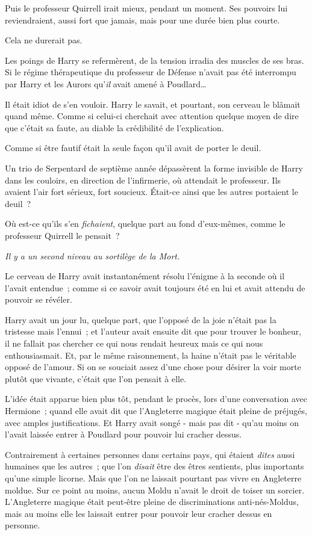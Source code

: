 Puis le professeur Quirrell irait mieux, pendant un moment. Ses pouvoirs lui reviendraient, aussi fort que jamais, mais pour une durée bien plus courte.

Cela ne durerait pas.

Les poings de Harry se refermèrent, de la tension irradia des muscles de ses bras. Si le régime thérapeutique du professeur de Défense n'avait pas été interrompu par Harry et les Aurors qu'\emph{il} avait amené à Poudlard…

Il était idiot de s'en vouloir. Harry le savait, et pourtant, son cerveau le blâmait quand même. Comme si celui-ci cherchait avec attention quelque moyen de dire que c'était sa faute, au diable la crédibilité de l'explication.

Comme si être fautif était la seule façon qu'il avait de porter le deuil.

Un trio de Serpentard de septième année dépassèrent la forme invisible de Harry dans les couloirs, en direction de l'infirmerie, où attendait le professeur. Ils avaient l'air fort sérieux, fort soucieux. Était-ce ainsi que les autres portaient le deuil~?

Où est-ce qu'ils s'en \emph{fichaient}, quelque part au fond d'eux-mêmes, comme le professeur Quirrell le pensait~?

\emph{Il y a un second niveau au sortilège de la Mort.}

Le cerveau de Harry avait instantanément résolu l'énigme à la seconde où il l'avait entendue~; comme si ce savoir avait toujours été en lui et avait attendu de pouvoir se révéler.

Harry avait un jour lu, quelque part, que l'opposé de la joie n'était pas la tristesse mais l'ennui~; et l'auteur avait ensuite dit que pour trouver le bonheur, il ne fallait pas chercher ce qui nous rendait heureux mais ce qui nous enthousiasmait. Et, par le même raisonnement, la haine n'était pas le véritable opposé de l'amour. Si on se souciait assez d'une chose pour désirer la voir morte plutôt que vivante, c'était que l'on pensait à elle.

L'idée était apparue bien plus tôt, pendant le procès, lors d'une conversation avec Hermione~; quand elle avait dit que l'Angleterre magique était pleine de préjugés, avec amples justifications. Et Harry avait songé - mais pas dit - qu'au moins on l'avait laissée entrer à Poudlard pour pouvoir lui cracher dessus.

Contrairement à certaines personnes dans certains pays, qui étaient \emph{dites} aussi humaines que les autres~; que l'on \emph{disait} être des êtres sentients, plus importants qu'une simple licorne. Mais que l'on ne laissait pourtant pas vivre en Angleterre moldue. Sur ce point au moins, aucun Moldu n'avait le droit de toiser un sorcier. L'Angleterre magique était peut-être pleine de discriminations anti-nés-Moldus, mais au moins elle les laissait entrer pour pouvoir leur cracher dessus en personne.

